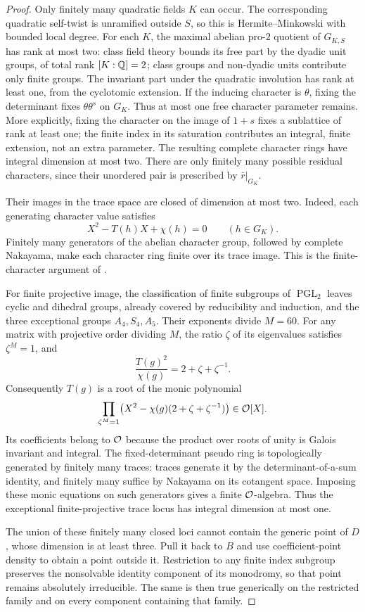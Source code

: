 \begin{proof}
Only finitely many quadratic fields $K$ can occur.  The corresponding
quadratic self-twist is unramified outside $S$, so this is
Hermite--Minkowski with bounded local degree.  For each $K$, the
maximal abelian pro-$2$ quotient of $G_{K,S}$ has rank at most two:
class field theory bounds its free part by the dyadic unit groups,
of total rank $[K:\mathbb Q]=2$; class groups and non-dyadic units contribute
only finite groups.  The invariant part under the quadratic
involution has rank at least one, from the cyclotomic extension.
If the inducing character is $\theta$, fixing the determinant fixes
$\theta\theta^s$ on $G_K$.  Thus at most one free character parameter
remains.  More explicitly, fixing the character on the image of
$1+s$ fixes a sublattice of rank at least one; the finite index in
its saturation contributes an integral, finite extension, not an
extra parameter.  The resulting complete character rings have
integral dimension at most two.  There are only finitely many
possible residual characters, since their unordered pair is
prescribed by $\bar r|_{G_K}$.

Their images in the trace space are closed of dimension at most two.
Indeed, each generating character value satisfies
\[
 X^2-T(h)X+\chi(h)=0\qquad(h\in G_K).
\]
Finitely many generators of the abelian character group, followed by
complete Nakayama, make each character ring finite over its trace
image.  This is the finite-character argument of
\cite[Proposition~3.1(3)]{FM2}.

For finite projective image, the classification of finite subgroups
of $\operatorname{PGL}_2$ leaves cyclic and dihedral groups, already
covered by reducibility and induction, and the three exceptional
groups $A_4,S_4,A_5$.  Their exponents divide $M=60$.
For any matrix with projective order dividing $M$, the ratio $\zeta$
of its eigenvalues satisfies $\zeta^M=1$, and
\[
 \frac{T(g)^2}{\chi(g)}=2+\zeta+\zeta^{-1}.
\]
Consequently $T(g)$ is a root of the monic polynomial
\[
 \prod_{\zeta^M=1}
  \bigl(X^2-\chi(g)(2+\zeta+\zeta^{-1})\bigr)\in\mathcal O[X].
\]
Its coefficients belong to $\mathcal O$ because the product over roots of
unity is Galois invariant and integral.  The fixed-determinant pseudo ring is
topologically generated by finitely many traces: traces generate it
by the determinant-of-a-sum identity, and finitely many suffice by
Nakayama on its cotangent space.  Imposing these monic equations on
such generators gives a finite $\mathcal O$-algebra.  Thus the exceptional
finite-projective trace locus has integral dimension at most one.

The union of these finitely many closed loci cannot contain the
generic point of $D$, whose dimension is at least three.  Pull it
back to $B$ and use coefficient-point density
\cite[Lemma~3.3(2)]{FM2} to obtain a point outside it.  Restriction to
any finite index subgroup preserves the nonsolvable identity
component of its monodromy, so that point remains absolutely
irreducible.  The same is then true generically on the restricted
family and on every component containing that family.
\end{proof}

